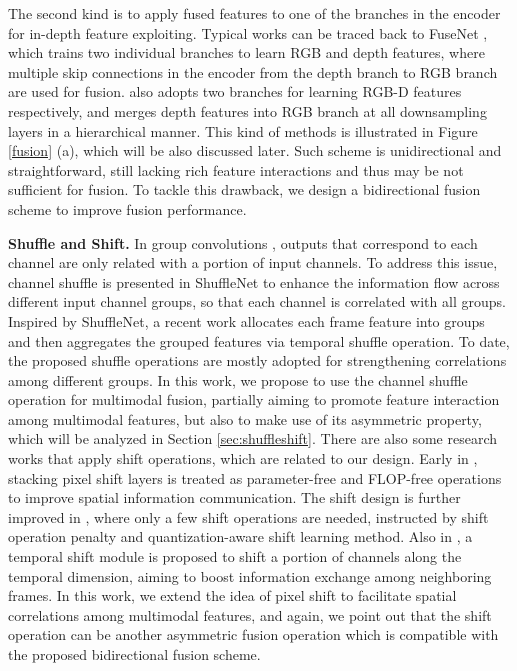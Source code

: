 \documentclass[sigconf]{acmart}
\begin{document}
The second kind is to apply fused features to one of the branches in the encoder for in-depth feature exploiting. Typical works can be traced back to FuseNet \cite{DBLP:conf/accv/HazirbasMDC16}, which trains two individual branches to learn RGB and depth features, where multiple skip connections in the encoder from the depth branch to RGB branch are used for fusion. \cite{DBLP:conf/cvpr/ZengTHYSCW19} also adopts two branches for learning RGB-D features respectively, and merges depth features into RGB branch at all downsampling layers in a hierarchical manner.
This kind of methods is illustrated in Figure \ref{fusion} (a), which will be also discussed later. Such scheme is unidirectional and straightforward, still lacking rich feature interactions and thus may be not sufficient for fusion. To tackle this drawback, we design a bidirectional fusion scheme to improve fusion performance.

\textbf{Shuffle and Shift.} In group convolutions \cite{DBLP:journals/corr/HowardZCKWWAA17,DBLP:conf/cvpr/Chollet17},  outputs that correspond to each channel are only related with a portion of input channels.  To address this issue, channel shuffle is presented in ShuffleNet \cite{DBLP:conf/cvpr/ZhangZLS18}  to enhance the information flow across different input channel groups, so that each channel is correlated with all groups. Inspired by ShuffleNet, a recent work \cite{DBLP:journals/corr/abs-1911-11319} allocates each frame feature into groups and then aggregates the grouped features via temporal shuffle operation.  To date, the proposed shuffle operations are mostly adopted for strengthening correlations among different groups. In this work, we propose to use the channel shuffle operation for multimodal fusion, partially aiming to promote feature interaction among multimodal features, but also to make use of its asymmetric property, which will be analyzed in Section \ref{sec:shuffleshift}. There are also some research works that apply shift operations, which are related to our design. Early in \cite{DBLP:conf/cvpr/WuWYJZGGGK18}, stacking pixel shift layers is treated as parameter-free and FLOP-free operations to improve spatial information communication. The shift design is further improved in \cite{DBLP:conf/cvpr/ChenXZP19}, where only a few shift operations are needed, instructed by shift operation penalty and quantization-aware shift learning method. Also in \cite{DBLP:conf/iccv/LinGH19}, a temporal shift module is proposed to shift a portion of channels along the temporal dimension, aiming to boost information exchange among neighboring frames. In this work, we extend the idea of pixel shift to facilitate spatial correlations among multimodal features, and again, we point out that the shift operation can be another asymmetric fusion operation which is compatible with the proposed bidirectional fusion scheme.
\end{document}
